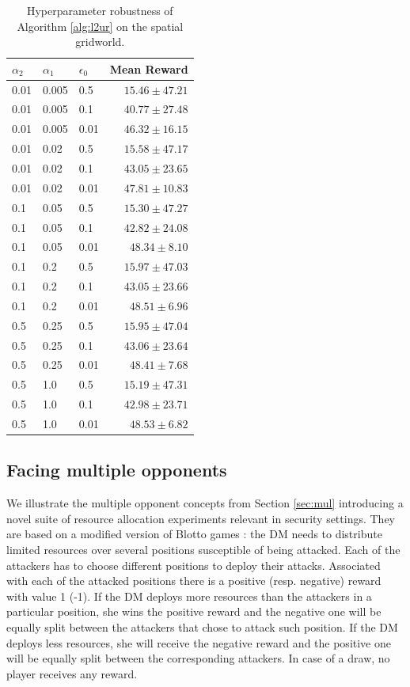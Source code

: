 \begingroup
\renewcommand{\arraystretch}{0.7}
\begin{table}[h]
\small
\caption{Hyperparameter robustness of Algorithm \ref{alg:l2ur} on the spatial gridworld.}\label{tab:rob}
\centering
\begin{tabular}{lllr}
\hline
$\alpha_2$ &  $\alpha_1$ & $\epsilon_0$ & Mean Reward \\
\hline
0.01 & 0.005 & 0.5 & $15.46 \pm 47.21$  \\
0.01 & 0.005 & 0.1 & $40.77 \pm 27.48$  \\
0.01 & 0.005 & 0.01 & $46.32 \pm 16.15$  \\\hline
0.01 & 0.02 & 0.5 & $15.58 \pm 47.17$  \\
0.01 & 0.02 & 0.1 & $43.05 \pm 23.65$  \\
0.01 & 0.02 & 0.01 & $47.81 \pm 10.83$  \\\hline
0.1 & 0.05 & 0.5 & $15.30 \pm 47.27$  \\
0.1 & 0.05 & 0.1 & $42.82 \pm 24.08$  \\
0.1 & 0.05 & 0.01 & $48.34 \pm 8.10$  \\\hline
0.1 & 0.2 & 0.5 & $15.97 \pm 47.03$  \\
0.1 & 0.2 & 0.1 & $43.05 \pm 23.66$  \\
0.1 & 0.2 & 0.01 & $48.51 \pm 6.96$  \\\hline
 0.5 & 0.25 & 0.5 & $15.95 \pm 47.04$  \\
 0.5 & 0.25 & 0.1 & $43.06 \pm 23.64$  \\
 0.5 & 0.25 & 0.01 & $48.41 \pm 7.68$  \\\hline
 0.5 & 1.0 & 0.5 & $15.19 \pm 47.31$  \\
 0.5 & 1.0 & 0.1 & $42.98 \pm 23.71$    \\
 0.5 & 1.0 & 0.01 & $48.53 \pm 6.82$  \\\hline
\end{tabular}
\end{table} 
\endgroup
\subsection{Facing multiple opponents}

We illustrate the multiple opponent concepts from Section \ref{sec:mul} introducing a novel suite of  resource allocation experiments 
relevant in security settings. They are based on a modified version of Blotto games \parencite{hart2008discrete}: the DM needs to distribute limited
resources over several positions susceptible of being attacked. Each of the attackers has to choose different positions
to deploy their attacks. Associated with each of the attacked positions there is a positive (resp. negative) reward with value 1 (-1). If the DM 
deploys more resources than the attackers in a particular position, she wins the positive reward and the negative one will be equally split  between
the attackers that chose to attack such position. If the DM deploys less resources, she will receive
the negative reward and the positive one will be equally split between the corresponding attackers.
In case of a draw, no player receives any reward.  

